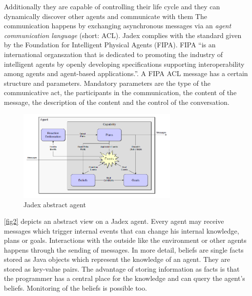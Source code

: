 Additionally they are capable of controlling their life cycle and they can dynamically discover other agents and communicate with them
The communication happens by exchanging asynchronous messages via an \emph{agent communication language} (short: ACL). Jadex complies with the standard given by the Foundation for Intelligent Physical Agents (FIPA). FIPA ``is an international organszation that is dedicated to promoting the industry of intelligent agents by openly developing specifications supporting interoperability among agents and agent-based applications.''\cite{FIPA}. A FIPA ACL message has a certain structure and parameters. Mandatory parameters are the type of the communicative act, the participants in the communication, the content of the message, the description of the content and the control of the conversation. %

\begin{figure}
	\centering
	\includegraphics[width=300px]{images/Jadex_agent.png}
	\caption{Jadex abstract agent \cite{pokahr_jadex_2005}}
	\label{fig2}
\end{figure}
\autoref{fig2} depicts an abstract view on a Jadex agent. Every agent may receive messages which trigger internal events that can change his internal knowledge, plans or goals. Interactions with the outside like the environment or other agents happens through the sending of messages. %
In more detail, beliefs are single facts stored as Java objects which represent the knowledge of an agent. %
They are stored as key-value pairs.
The advantage of storing information as facts is that the programmer has a central place for the knowledge and can query the agent's beliefs. %
Monitoring of the beliefs is possible too.

